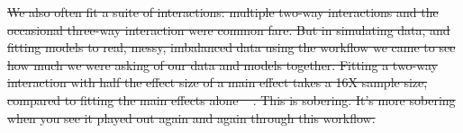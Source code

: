 \documentclass[11pt]{article}
\providecommand{\DIFdeltex}[1]{{\protect\color{red}\sout{#1}}}                      %
\providecommand{\DIFdelbegin}{} %
\providecommand{\DIFdelend}{} %
\providecommand{\DIFdel}[1]{\texorpdfstring{\DIFdeltex{#1}}{}} %
\newcommand{\DIFscaledelfig}{0.5}
\newlength{\DIFdelgraphicswidth} %
\newlength{\DIFdelgraphicsheight} %
\newcommand{\DIFdelincludegraphics}[2][]{%
\sbox{\DIFdelgraphicsbox}{\DIFOincludegraphics[#1]{#2}}%
\settoboxwidth{\DIFdelgraphicswidth}{\DIFdelgraphicsbox} %
\settoboxtotalheight{\DIFdelgraphicsheight}{\DIFdelgraphicsbox} %
\scalebox{\DIFscaledelfig}{%
\parbox[b]{\DIFdelgraphicswidth}{\usebox{\DIFdelgraphicsbox}\\[-\baselineskip] \rule{\DIFdelgraphicswidth}{0em}}\llap{\resizebox{\DIFdelgraphicswidth}{\DIFdelgraphicsheight}{%
\setlength{\unitlength}{\DIFdelgraphicswidth}%
\begin{picture}(1,1)%
\thicklines\linethickness{2pt} %
{\color[rgb]{1,0,0}\put(0,0){\framebox(1,1){}}}%
{\color[rgb]{1,0,0}\put(0,0){\line( 1,1){1}}}%
{\color[rgb]{1,0,0}\put(0,1){\line(1,-1){1}}}%
\end{picture}%
}\hspace*{3pt}}} %
} %
\DeclareRobustCommand{\DIFdelbegin}{\DIFOdelbegin \let\includegraphics\DIFdelincludegraphics} %
\DeclareRobustCommand{\DIFdelend}{\DIFOaddend \let\includegraphics\DIFOincludegraphics} %
\begin{document}
\DIFdelbegin \DIFdel{We also often fit a suite of interactions: multiple two-way interactions and the occasional three-way interaction were common fare. But in simulating data, and fitting models to real, messy, imbalanced data using the workflow we came to see how much we were asking of our data and models together. Fitting a two-way interaction with half the effect size of a main effect takes a 16X sample size, compared to fitting the main effects alone \mbox{%
\citep[the main effects then average over the interactions, see][for more details]{regotherstories}}\hskip0pt%
. This is sobering. It's more sobering when you see it played out again and again through this workflow. 
}\DIFdelend %
\end{document}
